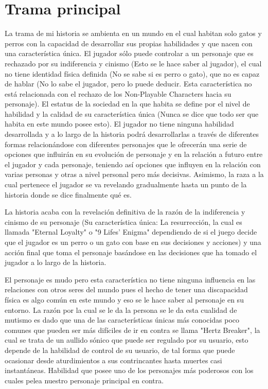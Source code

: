 \documentclass{article}
\begin{document}
\section{Trama principal} \label{contenido}
La trama de mi historia se ambienta en un mundo en el cual habitan solo gatos y perros con la capacidad de desarrollar sus propias habilidades y que nacen con una característica única. El jugador sólo puede controlar a un personaje que es rechazado por su indiferencia y cinismo (Esto se le hace saber al jugador), el cual no tiene identidad física definida (No se sabe si es perro o gato), que no es capaz de hablar (No lo sabe el jugador, pero lo puede deducir. Esta característica no está relacionada con el rechazo de los Non-Playable Characters hacia su personaje). El estatus de la sociedad en la que habita se define por el nivel de habilidad y la calidad de su característica única (Nunca se dice que todo ser que habita en este mundo posee esto). El jugador no tiene ninguna habilidad desarrollada y a lo largo de la historia podrá desarrollarlas a través de diferentes formas relacionándose con diferentes personajes que le ofrecerán una serie de opciones que influirán en su evolución de personaje y en la relación a futuro entre el jugador y cada personaje, teniendo así opciones que influyen en la relación con varias personas y otras a nivel personal pero más decisivas. Asimismo, la raza a la cual pertenece el jugador se va revelando gradualmente hasta un punto de la historia donde se dice finalmente qué es.

La historia acaba con la revelación definitiva de la razón de la indiferencia y cinismo de su personaje (Su característica única: La resurrección, la cual es llamada "Eternal Loyalty" o "9 Lifes' Enigma" dependiendo de si el juego decide que el jugador es un perro o un gato con base en sus decisiones y acciones) y una acción final que toma el personaje basándose en las decisiones que ha tomado el jugador a lo largo de la historia.

El personaje es mudo pero esta característica no tiene ninguna influencia en las relaciones con otros seres del mundo pues el hecho de tener una discapacidad física es algo común en este mundo y eso se le hace saber al personaje en su entorno.
La razón por la cual se le da la persona se le da esta cualidad de mutismo es dado que una de las características únicas más conocidas poco comunes que pueden ser más difíciles de ir en contra se llama "Hertz Breaker", la cual se trata de un aullido sónico que puede ser regulado por su usuario, esto depende de la habilidad de control de su usuario, de tal forma que puede ocasionar desde aturdimientos a sus contrincantes hasta muertes casi instantáneas. Habilidad que posee uno de los personajes más poderosos con los cuales pelea nuestro personaje principal en contra.
\end{document}
